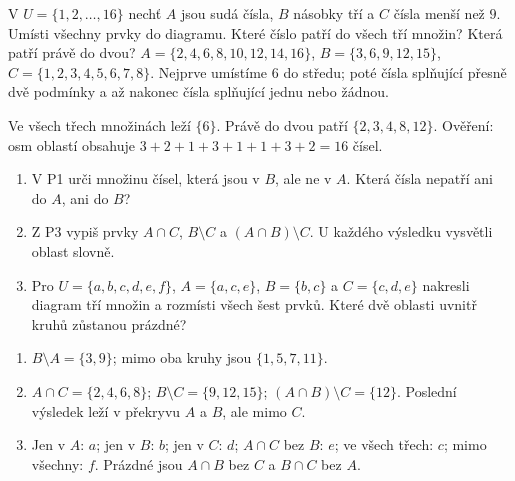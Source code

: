 \documentclass[11pt,a4paper]{article}
\begin{document}
\begin{prikladReseniBox}[title={Příklad 3}]
V $U=\{1,2,\ldots,16\}$ nechť $A$ jsou sudá čísla, $B$ násobky tří
a $C$ čísla menší než $9$. Umísti všechny prvky do diagramu.
Které číslo patří do všech tří množin? Která patří právě do dvou?
\tcblower
$A=\{2,4,6,8,10,12,14,16\}$,
$B=\{3,6,9,12,15\}$,
$C=\{1,2,3,4,5,6,7,8\}$.
Nejprve umístíme $6$ do středu; poté čísla splňující přesně dvě
podmínky a až nakonec čísla splňující jednu nebo žádnou.
\begin{center}
\end{center}
Ve všech třech množinách leží $\{6\}$. Právě do dvou patří
$\{2,3,4,8,12\}$. Ověření: osm oblastí obsahuje
$3+2+1+3+1+1+3+2=16$ čísel.
\end{prikladReseniBox}


\begin{zadaniReseniBox}[title={Samostatná práce 1}]
\begin{enumerate}[label=\alph*)]
\item V P1 urči množinu čísel, která jsou v $B$, ale ne v $A$.
Která čísla nepatří ani do $A$, ani do $B$?
\item Z P3 vypiš prvky $A\cap C$, $B\setminus C$ a
$(A\cap B)\setminus C$. U každého výsledku vysvětli oblast slovně.
\item Pro $U=\{a,b,c,d,e,f\}$, $A=\{a,c,e\}$, $B=\{b,c\}$
a $C=\{c,d,e\}$ nakresli diagram tří množin a rozmísti všech šest prvků.
Které dvě oblasti uvnitř kruhů zůstanou prázdné?
\end{enumerate}
\tcblower
\begin{enumerate}[label=\alph*)]
\item $B\setminus A=\{3,9\}$; mimo oba kruhy jsou $\{1,5,7,11\}$.
\item $A\cap C=\{2,4,6,8\}$; $B\setminus C=\{9,12,15\}$;
$(A\cap B)\setminus C=\{12\}$. Poslední výsledek
leží v překryvu $A$ a $B$, ale mimo $C$.
\item Jen v $A$: $a$; jen v $B$: $b$; jen v $C$: $d$;
$A\cap C$ bez $B$: $e$; ve všech třech: $c$; mimo všechny: $f$.
Prázdné jsou $A\cap B$ bez $C$ a $B\cap C$ bez $A$.
\end{enumerate}
\end{zadaniReseniBox}
\end{document}
